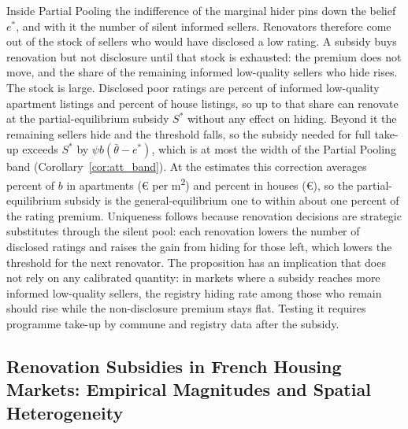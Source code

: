 \documentclass[10pt,letterpaper]{bp-template-concise}
\begin{document}
Inside Partial Pooling the indifference of the marginal hider pins down the belief $e^*$, and with it the number of silent informed sellers. Renovators therefore come out of the stock of sellers who would have disclosed a low rating. A subsidy buys renovation but not disclosure until that stock is exhausted: the premium does not move, and the share of the remaining informed low-quality sellers who hide rises. The stock is large. Disclosed poor ratings are \attGeDisclosedShareApt{} percent of informed low-quality apartment listings and \attGeDisclosedShareHouse{} percent of house listings, so up to that share can renovate at the partial-equilibrium subsidy $S^*$ without any effect on hiding. Beyond it the remaining sellers hide and the threshold falls, so the subsidy needed for full take-up exceeds $S^*$ by $\psi b(\bar\theta-e^*)$, which is at most the width of the Partial Pooling band (Corollary~\ref{cor:att_band}). At the estimates this correction averages \attGeCorrPctBApt{} percent of $b$ in apartments (\euro{}\attGeCorrEurApt{} per m\textsuperscript{2}) and \attGeCorrPctBHouse{} percent in houses (\euro{}\attGeCorrEurHouse{}), so the partial-equilibrium subsidy is the general-equilibrium one to within about one percent of the rating premium. Uniqueness follows because renovation decisions are strategic substitutes through the silent pool: each renovation lowers the number of disclosed ratings and raises the gain from hiding for those left, which lowers the threshold for the next renovator. The proposition has an implication that does not rely on any calibrated quantity: in markets where a subsidy reaches more informed low-quality sellers, the registry hiding rate among those who remain should rise while the non-disclosure premium stays flat. Testing it requires programme take-up by commune and registry data after the subsidy.

\subsection{Renovation Subsidies in French Housing Markets: Empirical Magnitudes and Spatial Heterogeneity}
\label{sec:policy_empirical}
\end{document}

